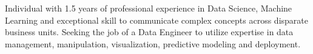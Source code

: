%
%
%
\par{
Individual with 1.5 years of professional experience in Data Science, Machine Learning and exceptional skill to communicate complex concepts across disparate business units. Seeking the job of a Data Engineer to utilize expertise in data management, manipulation, visualization, predictive modeling and deployment.

}